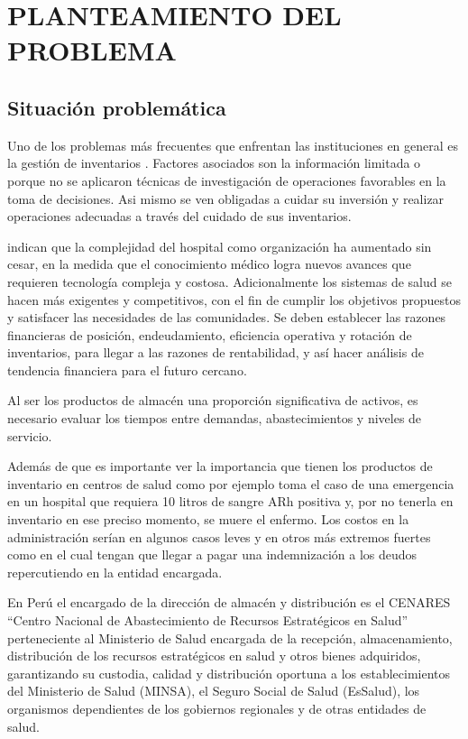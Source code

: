 \newpage
\chapter{PLANTEAMIENTO DEL PROBLEMA}

\section{Situación problemática}
Uno de los problemas más frecuentes que enfrentan las instituciones en general es la gestión de inventarios \citep{Flores_Tapia_2023}. Factores asociados son la información limitada o porque no se aplicaron técnicas de investigación de operaciones favorables en la toma de decisiones. Asi mismo se ven obligadas a cuidar su inversión y realizar operaciones adecuadas a través del cuidado de sus inventarios. \citep{Yanque_Vara_2023}

\cite{magalon2016gerencia} indican que la complejidad del hospital como organización ha aumentado sin cesar, en la medida que el conocimiento médico logra nuevos avances que requieren tecnología compleja y costosa. Adicionalmente los sistemas de salud se hacen más exigentes y competitivos, con el fin de cumplir los objetivos propuestos y satisfacer las necesidades de las comunidades. Se deben establecer las razones financieras de posición, endeudamiento, eficiencia operativa y rotación de inventarios, para llegar a las razones de rentabilidad, y así hacer análisis de tendencia financiera para el futuro cercano.

Al ser los productos de almacén una proporción significativa de activos, es necesario evaluar los tiempos entre demandas, abastecimientos y niveles de servicio.

Además de que es importante ver la importancia que tienen los productos de inventario en centros de salud como por ejemplo \cite{prawda2000metodos} toma el caso de una emergencia en un hospital que requiera 10 litros de sangre ARh positiva y, por no tenerla en inventario en ese preciso momento, se muere el enfermo. Los costos en la administración serían en algunos casos leves y en otros más extremos fuertes como en el cual tengan que llegar a pagar una indemnización a los deudos repercutiendo en la entidad encargada.

En Perú el encargado de la dirección de almacén y distribución es el CENARES ``Centro Nacional de Abastecimiento de Recursos Estratégicos en Salud'' perteneciente al Ministerio de Salud encargada de la recepción, almacenamiento, distribución de los recursos estratégicos en salud y otros bienes adquiridos, garantizando su custodia, calidad y distribución oportuna a los establecimientos del Ministerio de Salud (MINSA), el Seguro Social de Salud (EsSalud), los organismos dependientes de los gobiernos regionales y de otras entidades de salud.

